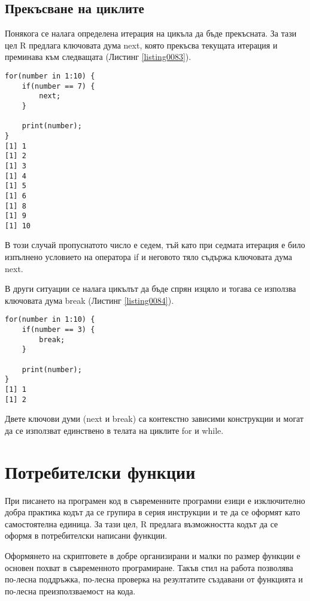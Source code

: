 \subsection{Прекъсване на циклите}

Понякога се налага определена итерация на цикъла да бъде прекъсната. За тази цел R предлага ключовата дума next, която прекъсва текущата итерация и преминава към следващата (Листинг \ref{listing0083}).

\begin{lstlisting}[caption=Прекъсване на итерация, label=listing0083]
for(number in 1:10) { 
	if(number == 7) {
		next;
	}

	print(number);
}
[1] 1
[1] 2
[1] 3
[1] 4
[1] 5
[1] 6
[1] 8
[1] 9
[1] 10
\end{lstlisting}

В този случай пропуснатото число е седем, тъй като при седмата итерация е било изпълнено условието на оператора if и неговото тяло съдържа ключовата дума next.

В други ситуации се налага цикълът да бъде спрян изцяло и тогава се използва ключовата дума break (Листинг \ref{listing0084}).

\begin{lstlisting}[caption=Прекъсване на цикъла, label=listing0084]
for(number in 1:10) { 
	if(number == 3) {
		break;
	}

	print(number);
}
[1] 1
[1] 2
\end{lstlisting}

Двете ключови думи (next и break) са контекстно зависими конструкции и могат да се използват единствено в телата на циклите for и while. 

\section{Потребителски функции}

При писането на програмен код в съвременните програмни езици е изключително добра практика кодът да се групира в серия инструкции и те да се оформят като самостоятелна единица. За тази цел, R предлага възможността кодът да се оформя в потребителски написани функции. 

Оформянето на скриптовете в добре организирани и малки по размер функции е основен похват в съвременното програмиране. Такъв стил на работа позволява по-лесна поддръжка, по-лесна проверка на резултатите създавани от функцията и по-лесна преизползваемост на кода. 

